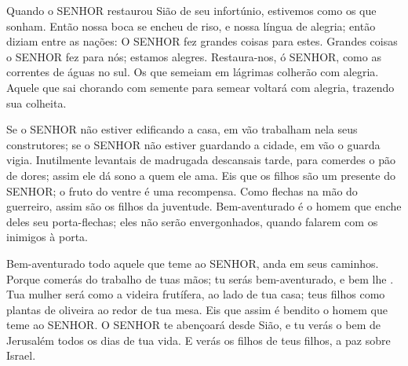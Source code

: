 

{\PP 
  Quando o SENHOR restaurou Sião de seu infortúnio, estivemos como os que sonham.
  Então nossa boca se encheu de riso, e nossa língua de alegria; então diziam entre as nações: O SENHOR fez grandes coisas para estes.
  Grandes coisas o SENHOR fez para nós;
{} estamos alegres.
  Restaura-nos,
 ó SENHOR, como as correntes de águas no sul.
  Os que semeiam em lágrimas colherão com alegria.
  Aquele que sai chorando com semente para semear voltará com alegria, trazendo sua colheita.
\par }


{\PP 
  Se o SENHOR não estiver edificando a casa, em vão trabalham nela seus construtores; se o SENHOR não estiver guardando a cidade, em vão o guarda vigia.
  Inutilmente levantais de madrugada
{} descansais tarde, para comerdes o pão de dores;
{} assim ele dá sono a quem ele ama.
  Eis que os filhos são um presente do SENHOR; o fruto do ventre é uma recompensa.
  Como flechas na mão do guerreiro, assim são os filhos da juventude.
  Bem-aventurado é o homem que enche deles seu porta-flechas; eles não serão envergonhados, quando falarem com os inimigos à porta.
\par }


{\PP 
  Bem-aventurado todo aquele que teme ao SENHOR,
{} anda em seus caminhos.
  Porque comerás do trabalho de tuas mãos; tu serás bem-aventurado, e bem lhe
{} .
  Tua mulher será como a videira frutífera, ao lado de tua casa;
{} teus filhos como plantas de oliveira ao redor de tua mesa.
  Eis que assim é bendito o homem que teme ao SENHOR.
  O SENHOR te abençoará desde Sião, e tu verás o bem de Jerusalém todos os dias de tua vida.
  E verás os filhos de teus filhos,
{} a paz sobre Israel.
\par }

